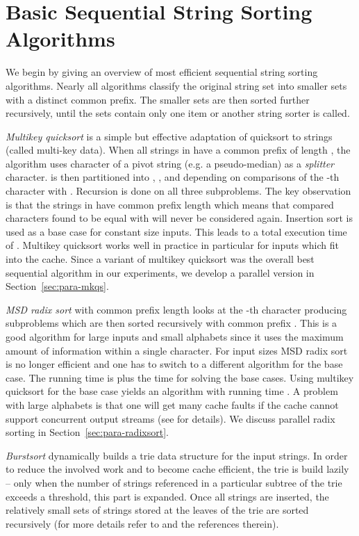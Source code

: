 \documentclass[a4paper]{myjournal}
\begin{document}
\section{Basic Sequential String Sorting Algorithms}\label{sec:basic-sequential}

We begin by giving an overview of most efficient sequential string sorting
algorithms. Nearly all algorithms classify the original string set 
into smaller sets with a distinct common prefix. The smaller sets are then
sorted further recursively, until the sets contain only one item or another
string sorter is called.

\emph{Multikey quicksort} \cite{bentley1997fast} is a simple but effective
adaptation of quicksort to strings (called multi-key data).  When all strings in
 have a common prefix of length , the algorithm uses character
 of a pivot string  (e.g. a pseudo-median) as a
\emph{splitter} character.  is then partitioned into ,
, and  depending on comparisons of the -th
character with . Recursion is done on all three subproblems. The key
observation is that the strings in  have common prefix length
 which means that compared characters found to be equal with  will
never be considered again. Insertion sort is used as a base case for constant
size inputs. This leads to a total execution time of . Multikey
quicksort works well in practice in particular for inputs which fit into the
cache. Since a variant of multikey quicksort was the overall best sequential
algorithm in our experiments, we develop a parallel version in
Section~\ref{sec:para-mkqs}.

\emph{MSD radix sort}
\cite{mcilroy1993engineering,ng2007cache,karkkainen2009engineering} with common
prefix length  looks at the -th character producing 
subproblems which are then sorted recursively with common prefix . This
is a good algorithm for large inputs and small alphabets since it uses the
maximum amount of information within a single character. For input sizes
 MSD radix sort is no longer efficient and one has to switch to a
different algorithm for the base case. The running time is  plus the
time for solving the base cases. Using multikey quicksort for the base case
yields an algorithm with running time . A problem with large
alphabets is that one will get many cache faults if the cache cannot support
 concurrent output streams (see \cite{mehlhorn2003scanning} for
details). We discuss parallel radix sorting in Section~\ref{sec:para-radixsort}.

\emph{Burstsort} dynamically builds a trie data structure for the input
strings. In order to reduce the involved work and to become cache efficient, the
trie is build lazily -- only when the number of strings referenced in a
particular subtree of the trie exceeds a threshold, this part is expanded. Once
all strings are inserted, the relatively small sets of strings stored at the
leaves of the trie are sorted recursively (for more details refer to
\cite{sinha2004cache-conscious,sinha2007cache-efficient,sinha2010engineering}
and the references therein).
\end{document}
